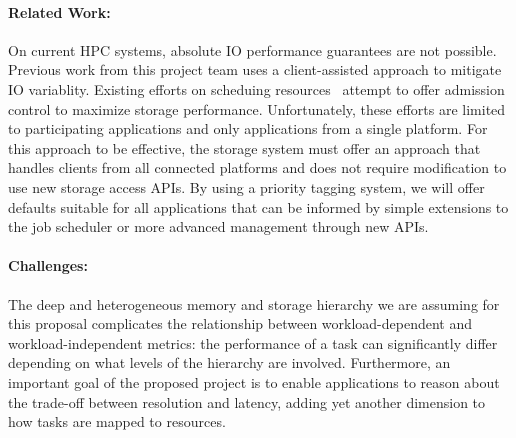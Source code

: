 \paragraph{Related Work:} On current HPC systems, absolute IO performance
guarantees are not possible. Previous work \cite{lofstead:2010:io-variability,liu_hotstorage} 
from this project team uses a client-assisted approach to mitigate IO variablity.
Existing efforts on scheduing resources~\cite{thapaliya:2014:io-cop,dorier:2014:calciom} attempt to offer
admission control to maximize storage performance. Unfortunately, these efforts
are limited to participating applications and only applications from a single
platform. For this approach to be effective, the storage system must offer an
approach that handles clients from all connected platforms and does not
require modification to use new storage access APIs. By using a priority
tagging system, we will offer defaults suitable for all applications that can
be informed by simple extensions to the job scheduler or more advanced
management through new APIs.

\paragraph{Challenges:} The deep and heterogeneous memory and storage
hierarchy we are assuming for this proposal complicates the
relationship between workload-dependent and workload-independent
metrics: the performance of a task can significantly differ depending
on what levels of the hierarchy are involved. Furthermore, an
important goal of the proposed project is to enable applications
to reason about the trade-off between resolution and latency, adding
yet another dimension to how tasks are mapped to resources.

